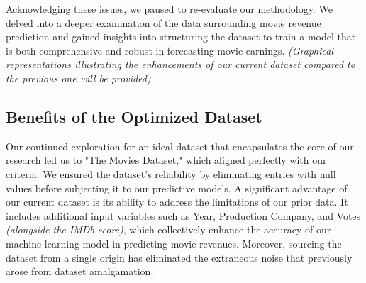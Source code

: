 \documentclass[conference]{IEEEtran}
\begin{document}
        Acknowledging these issues, we paused to re-evaluate our methodology. We delved into a deeper examination of the data surrounding movie revenue prediction and gained insights into structuring the dataset to train a model that is both comprehensive and robust in forecasting movie earnings. \textit{(Graphical representations illustrating the enhancements of our current dataset compared to the previous one will be provided)}.

    \subsection{Benefits of the Optimized Dataset}
        Our continued exploration for an ideal dataset that encapsulates the core of our research led us to "The Movies Dataset," which aligned perfectly with our criteria. We ensured the dataset's reliability by eliminating entries with null values before subjecting it to our predictive models. A significant advantage of our current dataset is its ability to address the limitations of our prior data. It includes additional input variables such as Year, Production Company, and Votes \textit{(alongside the IMDb score)}, which collectively enhance the accuracy of our machine learning model in predicting movie revenues. Moreover, sourcing the dataset from a single origin has eliminated the extraneous noise that previously arose from dataset amalgamation.
\end{document}
